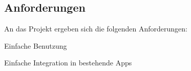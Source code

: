 \subsection{Anforderungen}\label{subsec:anforderungen}
An das Projekt ergeben sich die folgenden Anforderungen:
\begin{compactitem}
	\item Einfache Benutzung
	\item Einfache Integration in bestehende Apps
	
\end{compactitem}